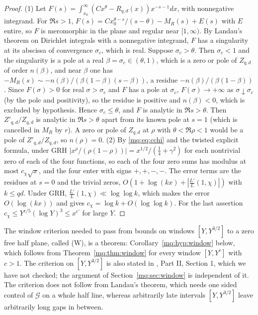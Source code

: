 \begin{proof}
(1) Let $F(s)=\int_{x_0}^\infty(Cx^\theta-R_{q,d}(x))x^{-s-1}dx$, with nonnegative integrand. For $\Re s>1$, $F(s)=Cx_0^{\theta-s}/(s-\theta)-M_R(s)+E(s)$ with $E$ entire, so $F$ is meromorphic in the plane and regular near $[1,\infty)$. By Landau's theorem on Dirichlet integrals with a nonnegative integrand, $F$ has a singularity at its abscissa of convergence $\sigma_c$, which is real. Suppose $\sigma_c>\theta$. Then $\sigma_c<1$ and the singularity is a pole at a real $\beta=\sigma_c\in(\theta,1)$, which is a zero or pole of $Z_{q,d}$ of order $n(\beta)$, and near $\beta$ one has $-M_R(s)\sim-n(\beta)/(\beta(1-\beta)(s-\beta))$, a residue $-n(\beta)/(\beta(1-\beta))$. Since $F(\sigma)>0$ for real $\sigma>\sigma_c$ and $F$ has a pole at $\sigma_c$, $F(\sigma)\to+\infty$ as $\sigma\downarrow\sigma_c$ (by the pole and positivity), so the residue is positive and $n(\beta)<0$, which is excluded by hypothesis. Hence $\sigma_c\le\theta$, and $F$ is analytic in $\Re s>\theta$. Then $Z'_{q,d}/Z_{q,d}$ is analytic in $\Re s>\theta$ apart from its known pole at $s=1$ (which is cancelled in $M_R$ by $r$). A zero or pole of $Z_{q,d}$ at $\rho$ with $\theta<\Re\rho<1$ would be a pole of $Z'_{q,d}/Z_{q,d}$, so $n(\rho)=0$.
(2) By \eqref{mq:eq:cchi} and the twisted explicit formula, under GRH $|x^{\rho}/(\rho(1-\rho))|=x^{1/2}/(\frac14+\gamma^2)$ for each nontrivial zero of each of the four functions, so each of the four zero sums has modulus at most $c_\chi\sqrt x$, and the four enter with signs $+,+,-,-$. The error terms are the residues at $s=0$ and the trivial zeros, $O(1+\log(kx)+|\frac{L'}L(1,\chi)|)$ with $k\le qd$. Under GRH, $\frac{L'}{L}(1,\chi)\ll\log\log k$, which makes the error $O(\log(kx))$ and gives $c_\chi=\log k+O(\log\log k)$. For the last assertion $c_\chi\le Y^{\epsilon/5}(\log Y)^3\le x^{\epsilon'}$ for large $Y$.
\end{proof}

The window criterion needed to pass from bounds on windows $[Y,Y^{3/2}]$ to a zero free half plane, called (W), is a theorem: Corollary~\ref{mq:hyp:window} below, which follows from Theorem~\ref{mq:thm:window} for every window $[Y,Y^c]$ with $c>1$. The criterion on $[Y,Y^{3/2}]$ is also stated in \cite{Rub26}, Part II, Section 1, which we have not checked; the argument of Section~\ref{mq:sec:window} is independent of it. The criterion does not follow from Landau's theorem, which needs one sided control of $\mathcal G$ on a whole half line, whereas arbitrarily late intervals $[Y,Y^{3/2}]$ leave arbitrarily long gaps in between.

